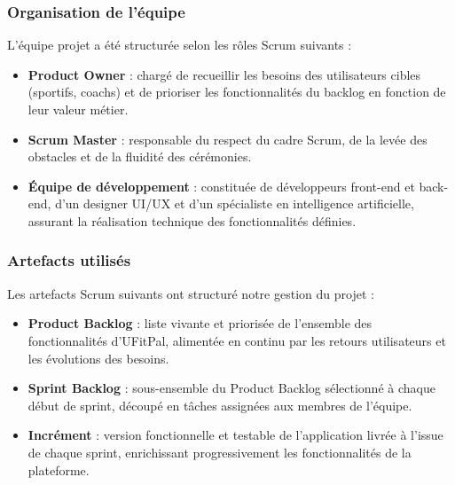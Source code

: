 ﻿\documentclass[a4paper,12pt]{report}
\begin{document}
\subsubsection{Organisation de l'équipe}
L'équipe projet a été structurée selon les rôles Scrum suivants :
\begin{itemize}
    \item \textbf{Product Owner} : chargé de recueillir les besoins des utilisateurs cibles 
    (sportifs, coachs) et de prioriser les fonctionnalités du backlog en fonction de leur 
    valeur métier.
    \item \textbf{Scrum Master} : responsable du respect du cadre Scrum, de la levée des 
    obstacles et de la fluidité des cérémonies.
    \item \textbf{Équipe de développement} : constituée de développeurs front-end et back-end, 
    d'un designer UI/UX et d'un spécialiste en intelligence artificielle, assurant la 
    réalisation technique des fonctionnalités définies.
\end{itemize}

\subsubsection{Artefacts utilisés}
Les artefacts Scrum suivants ont structuré notre gestion du projet :
\begin{itemize}
    \item \textbf{Product Backlog} : liste vivante et priorisée de l'ensemble des 
    fonctionnalités d'UFitPal, alimentée en continu par les retours utilisateurs et les 
    évolutions des besoins.
    \item \textbf{Sprint Backlog} : sous-ensemble du Product Backlog sélectionné à chaque 
    début de sprint, découpé en tâches assignées aux membres de l'équipe.
    \item \textbf{Incrément} : version fonctionnelle et testable de l'application livrée 
    à l'issue de chaque sprint, enrichissant progressivement les fonctionnalités de la 
    plateforme.
\end{itemize}
\end{document}
